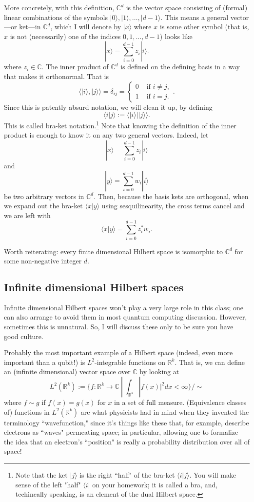 \documentclass{article}
\newcommand{\ket}[1]{|#1\rangle}
\newcommand{\bra}[1]{\langle#1|}
\newcommand{\braket}[2]{\langle#1|#2\rangle}
\newcommand{\bbC}{\mathbb{C}}
\begin{document}
More concretely, with this definition, $\bbC^d$ is the vector space consisting of (formal) linear combinations of the symbols $\ket{0},\ket{1},\dots,\ket{d-1}$.  This means a general vector---or ket---in $\bbC^d$, which I will denote by $\ket{x}$ where $x$ is some other symbol (that is, $x$ is not (necessarily) one of the indices $0,1,\dots,d-1$) looks like
\[ \ket{x} = \sum_{i=0}^{d-1} z_i \ket{i}.\]
where $z_i \in \bbC$.  The inner product of $\bbC^d$ is defined on the defining basis in a way that makes it orthonormal.  That is
\[ \langle \ket{i}, \ket{j} \rangle = \delta_{ij} = \begin{cases} 0 & \text{ if } i \ne j, \\ 1 & \text{ if } i=j. \end{cases}.\]
Since this is patently absurd notation, we will clean it up, by defining
\[ \braket{i}{j} := \braket{\ket{i}}{\ket{j}}. \]
This is called bra-ket notation.\footnote{Note that the ket $\ket{j}$ is the right ``half" of the bra-ket $\braket{i}{j}$.  You will make sense of the left "half" $\bra{i}$ on your homework; it is called a bra, and, techincally speaking, is an element of the dual Hilbert space.}
Note that knowing the definition of the inner product is enough to know it on any two general vectors.  Indeed, let
\[ \ket{x} = \sum_{i=0}^{d-1} z_i \ket{i} \]
and 
\[ \ket{y} = \sum_{i=0}^{d-1} w_i \ket{i} \]
be two arbitrary vectors in $\bbC^d$.  Then, because the basis kets are orthogonal, when we expand out the bra-ket $\braket{x}{y}$ using sesquilinearity, the cross terms cancel and we are left with
\[ \braket{x}{y} = \sum_{i=0}^{d-1} z_i^*w_i.\]

Worth reiterating: every finite dimensional Hilbert space is isomorphic to $\mathbb{C}^d$ for some non-negative integer $d$.

\subsection{Infinite dimensional Hilbert spaces}
Infinite dimensional Hilbert spaces won't play a very large role in this class; one can also arrange to avoid them in most quantum computing discussion.  However, sometimes this is unnatural.  So,
I will discuss these only to be sure you have good culture.

Probably the most important example of a Hilbert space (indeed, even more important than a qubit!) is $L^2$-integrable functions on $\mathbb{R}^k$.  That is, we can define an (infinite dimensional) vector space over $\bbC$ by looking at
\[ L^2(\mathbb{R}^k) := \{f : \mathbb{R}^k\to\mathbb{C}~|~\int_{\mathbb{R}^k}|f(x)|^2 dx < \infty\}/\sim\]
where $f\sim g$ if $f(x) = g(x)$ for $x$ in a set of full measure.  (Equivalence classes of) functions in $L^2(\mathbb{R}^k)$ are what physicists had in mind when they invented the terminology ``wavefunction," since it's things like these that, for example, describe electrons as ``waves" permeating space; in particular, allowing one to formalize the idea that an electron's ``position" is really a probability distribution over all of space!
\end{document}
